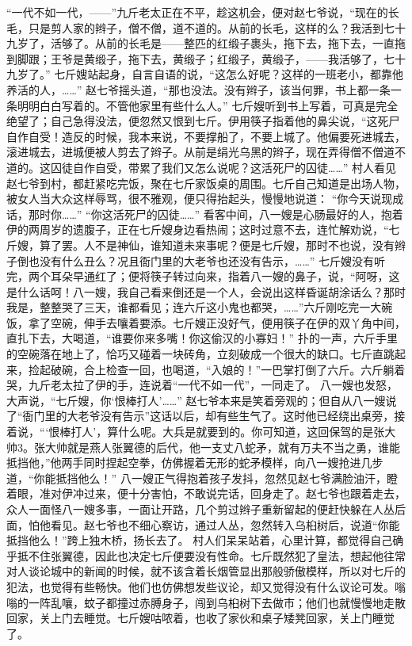 \documentclass[12pt,UTF8]{ctexbook}
\begin{document}
“一代不如一代，——”九斤老太正在不平，趁这机会，便对赵七爷说，“现在的长毛，只是剪人家的辫子，僧不僧，道不道的。从前的长毛，这样的么？我活到七十九岁了，活够了。从前的长毛是——整匹的红缎子裹头，拖下去，拖下去，一直拖到脚跟；王爷是黄缎子，拖下去，黄缎子；红缎子，黄缎子，——我活够了，七十九岁了。”
七斤嫂站起身，自言自语的说，“这怎么好呢？这样的一班老小，都靠他养活的人，……”
赵七爷摇头道，“那也没法。没有辫子，该当何罪，书上都一条一条明明白白写着的。不管他家里有些什么人。”
七斤嫂听到书上写着，可真是完全绝望了；自己急得没法，便忽然又恨到七斤。伊用筷子指着他的鼻尖说，“这死尸自作自受！造反的时候，我本来说，不要撑船了，不要上城了。他偏要死进城去，滚进城去，进城便被人剪去了辫子。从前是绢光乌黑的辫子，现在弄得僧不僧道不道的。这囚徒自作自受，带累了我们又怎么说呢？这活死尸的囚徒……”
村人看见赵七爷到村，都赶紧吃完饭，聚在七斤家饭桌的周围。七斤自己知道是出场人物，被女人当大众这样辱骂，很不雅观，便只得抬起头，慢慢地说道：
“你今天说现成话，那时你……”
“你这活死尸的囚徒……”
看客中间，八一嫂是心肠最好的人，抱着伊的两周岁的遗腹子，正在七斤嫂身边看热闹；这时过意不去，连忙解劝说，“七斤嫂，算了罢。人不是神仙，谁知道未来事呢？便是七斤嫂，那时不也说，没有辫子倒也没有什么丑么？况且衙门里的大老爷也还没有告示，……”
七斤嫂没有听完，两个耳朵早通红了；便将筷子转过向来，指着八一嫂的鼻子，说，“阿呀，这是什么话呵！八一嫂，我自己看来倒还是一个人，会说出这样昏诞胡涂话么？那时我是，整整哭了三天，谁都看见；连六斤这小鬼也都哭，……”六斤刚吃完一大碗饭，拿了空碗，伸手去嚷着要添。七斤嫂正没好气，便用筷子在伊的双丫角中间，直扎下去，大喝道，“谁要你来多嘴！你这偷汉的小寡妇！”
扑的一声，六斤手里的空碗落在地上了，恰巧又碰着一块砖角，立刻破成一个很大的缺口。七斤直跳起来，捡起破碗，合上检查一回，也喝道，“入娘的！”一巴掌打倒了六斤。六斤躺着哭，九斤老太拉了伊的手，连说着“一代不如一代”，一同走了。
八一嫂也发怒，大声说，“七斤嫂，你‘恨棒打人’……”
赵七爷本来是笑着旁观的；但自从八一嫂说了“衙门里的大老爷没有告示”这话以后，却有些生气了。这时他已经绕出桌旁，接着说，“‘恨棒打人’，算什么呢。大兵是就要到的。你可知道，这回保驾的是张大帅3。张大帅就是燕人张翼德的后代，他一支丈八蛇矛，就有万夫不当之勇，谁能抵挡他，”他两手同时捏起空拳，仿佛握着无形的蛇矛模样，向八一嫂抢进几步道，“你能抵挡他么！”
八一嫂正气得抱着孩子发抖，忽然见赵七爷满脸油汗，瞪着眼，准对伊冲过来，便十分害怕，不敢说完话，回身走了。赵七爷也跟着走去，众人一面怪八一嫂多事，一面让开路，几个剪过辫子重新留起的便赶快躲在人丛后面，怕他看见。赵七爷也不细心察访，通过人丛，忽然转入乌桕树后，说道“你能抵挡他么！”跨上独木桥，扬长去了。
村人们呆呆站着，心里计算，都觉得自己确乎抵不住张翼德，因此也决定七斤便要没有性命。七斤既然犯了皇法，想起他往常对人谈论城中的新闻的时候，就不该含着长烟管显出那般骄傲模样，所以对七斤的犯法，也觉得有些畅快。他们也仿佛想发些议论，却又觉得没有什么议论可发。嗡嗡的一阵乱嚷，蚊子都撞过赤膊身子，闯到乌桕树下去做市；他们也就慢慢地走散回家，关上门去睡觉。七斤嫂咕哝着，也收了家伙和桌子矮凳回家，关上门睡觉了。
\end{document}
